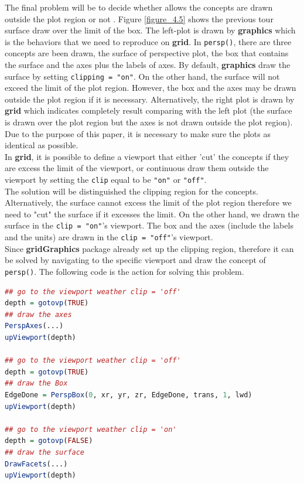 \documentclass{report}
\begin{document}
The final problem will be to decide whether allows the concepts are drawn outside the plot region or not . Figure \ref{figure_4.5} shows the previous tour surface draw over the limit of the box. The left-plot is drawn by \textbf{graphics} which is the behaviors that we need to reproduce on \textbf{grid}. In \texttt{persp()}, there are three concepts are been drawn, the surface of perspective plot, the box that contains the surface and the axes plus the labels of axes. By default, \textbf{graphics} draw the surface by setting \texttt{clipping = "on"}. On the other hand, the surface will not exceed the limit of the plot region. However, the box and the axes may be drawn outside the plot region if it is necessary. Alternatively, the right plot is drawn by \textbf{grid} which indicates completely result comparing with the left plot (the surface is drawn over the plot region but the axes is not drawn outside the plot region). Due to the purpose of this paper, it is necessary to make sure the plots as identical as possible.\\
In \textbf{grid}, it is possible to define a viewport that either 'cut' the concepts if they are excess the limit of the viewport, or continuous draw them outside the viewport by setting the \texttt{clip} equal to be \texttt{"on"} or \texttt{"off"}.\\
The solution will be distinguished the clipping region for the concepts. Alternatively, the surface cannot excess the limit of the plot region therefore we need to "cut" the surface if it excesses the limit. On the other hand, we drawn the surface in the \texttt{clip = "on"}'s viewport. The box and the axes (include the labels and the units) are drawn in the \texttt{clip = "off"}'s viewport.\\
Since \textbf{gridGraphics} package already set up the clipping region, therefore it can be solved by navigating to the specific viewport and draw the concept of \texttt{persp()}. The following code is the action for solving this problem.

\newpage
\begin{lstlisting}[language = R]
## go to the viewport weather clip = 'off'
depth = gotovp(TRUE)
## draw the axes
PerspAxes(...)
upViewport(depth)

## go to the viewport weather clip = 'off'
depth = gotovp(TRUE)
## draw the Box
EdgeDone = PerspBox(0, xr, yr, zr, EdgeDone, trans, 1, lwd)
upViewport(depth)

## go to the viewport weather clip = 'on'
depth = gotovp(FALSE)
## draw the surface
DrawFacets(...)
upViewport(depth)
\end{lstlisting}\\
\end{document}
